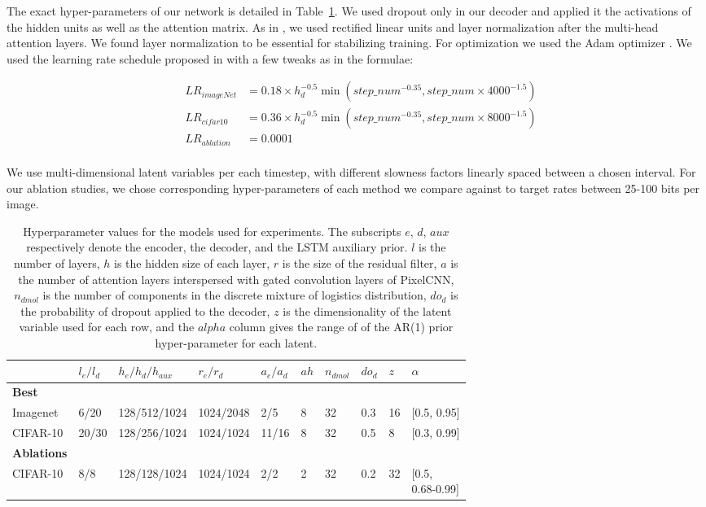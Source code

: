 \documentclass{article} \usepackage{iclr2019_conference,times}
\newcommand{\tblref}[1]{Table~\ref{#1}}
\begin{document}
The exact hyper-parameters of our network is detailed in \tblref{tbl:hyp}. We used dropout only in our decoder and applied it
the activations of the hidden units as well as the attention matrix. As in \citep{Vaswani2017}, we used rectified linear units and layer normalization \citep{layernorm} after the multi-head attention layers. We found layer normalization to be essential for stabilizing training. For optimization we used the Adam optimizer \citep{adam}. We used the learning rate schedule 
proposed in \citep{Vaswani2017} with a few tweaks as in the formulae:


\begin{equation*}
\begin{aligned}
& LR_{imageNet} &= 0.18 \times h_{d}^{-0.5} \min(step\_num^{−0.35}, step\_num \times 4000^{−1.5}) \\
& LR_{cifar10}  &= 0.36 \times  h_{d}^{-0.5} \min(step\_num^{−0.35}, step\_num \times 8000^{−1.5})\\
& LR_{ablation} &= 0.0001 \\
\end{aligned}
\end{equation*}
    
We use multi-dimensional latent variables per each timestep, with different slowness factors linearly spaced between a chosen interval. For our ablation studies, we chose corresponding hyper-parameters of each method we compare against to target rates between 25-100 bits per image.

\begin{table}[h]
\centering
\begin{tabular}{@{}l|lllllllll@{}}
                    &  $l_e/l_d$ & $h_e/h_d/h_{aux}$ & $r_e/r_d$ & $a_e/a_d$ & $ah$ &$n_{dmol}$ & $do_{d}$ & $z$ & $\alpha$\\
\toprule
\textbf{Best} \\
Imagenet   & 6/20 & 128/512/1024 &  1024/2048 & 2/5 & 8 & 32 & 0.3 & 16 & [0.5, 0.95] \\
CIFAR-10     & 20/30 & 128/256/1024 &  1024/1024 & 11/16 & 8 & 32 & 0.5 & 8 & [0.3, 0.99] \\
\midrule
\textbf{Ablations} \\
CIFAR-10 & 8/8 & 128/128/1024 & 1024/1024 & 2/2 & 2 & 32 & 0.2 & 32 &\shortstack{[0.5, \\ 0.68-0.99]} \\
\bottomrule
\end{tabular}
\caption{Hyperparameter values for the models used for experiments. The subscripts $e$, $d$, $aux$ respectively denote the encoder, the decoder, and the LSTM auxiliary prior. $l$ is the number of layers, $h$ is the hidden size of each layer, $r$ is the size of the residual filter, $a$ is the number of attention layers interspersed with gated convolution layers of PixelCNN, $n_{dmol}$ is the number of components in the discrete mixture of logistics distribution, $do_{d}$ is the probability of dropout applied to the decoder, $z$ is the dimensionality of the latent variable used for each row, and the $alpha$ column gives the range of of the AR(1) prior hyper-parameter for each latent.}\label{tbl:hyp}
\end{table}
\end{document}
